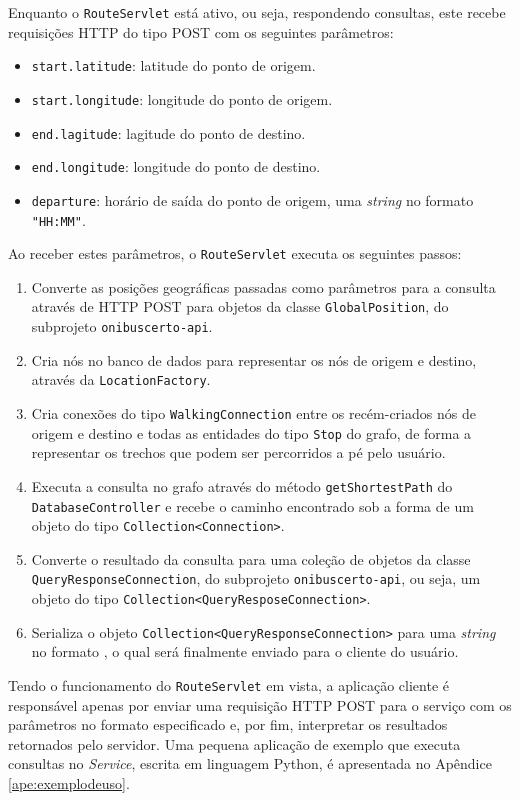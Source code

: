 Enquanto o \texttt{RouteServlet} está ativo, ou seja, respondendo consultas, este recebe requisições HTTP do tipo POST com os seguintes parâmetros:
\begin{itemize}
	\item \texttt{start.latitude}: latitude do ponto de origem.
	\item \texttt{start.longitude}: longitude do ponto de origem.
	\item \texttt{end.lagitude}: lagitude do ponto de destino.
	\item \texttt{end.longitude}: longitude do ponto de destino.
	\item \texttt{departure}: horário de saída do ponto de origem, uma \emph{string} no formato \texttt{"HH:MM"}.
\end{itemize}

Ao receber estes parâmetros, o \texttt{RouteServlet} executa os seguintes passos:
\begin{enumerate}
	\item Converte as posições geográficas passadas como parâmetros para a consulta através de HTTP POST para objetos da classe \texttt{GlobalPosition}, do subprojeto \texttt{onibuscerto-api}.
	\item Cria nós no banco de dados para representar os nós de origem e destino, através da \texttt{LocationFactory}.
	\item Cria conexões do tipo \texttt{WalkingConnection} entre os recém-criados nós de origem e destino e todas as entidades do tipo \texttt{Stop} do grafo, de forma a representar os trechos que podem ser percorridos a pé pelo usuário.
	\item Executa a consulta no grafo através do método \texttt{getShortestPath} do \texttt{DatabaseController} e recebe o caminho encontrado sob a forma de um objeto do tipo \texttt{Collection<Connection>}.
	\item Converte o resultado da consulta para uma coleção de objetos da classe \texttt{QueryResponseConnection}, do subprojeto \texttt{onibuscerto-api}, ou seja, um objeto do tipo \texttt{Collection<QueryResposeConnection>}.
	\item Serializa o objeto \texttt{Collection<QueryResponseConnection>} para uma \emph{string} no formato , o qual será finalmente enviado para o cliente do usuário.
\end{enumerate}

Tendo o funcionamento do \texttt{RouteServlet} em vista, a aplicação cliente é responsável apenas por enviar uma requisição HTTP POST para o serviço com os parâmetros no formato especificado e, por fim, interpretar os resultados retornados pelo servidor.
Uma pequena aplicação de exemplo que executa consultas no \emph{Service}, escrita em linguagem Python, é apresentada no Apêndice \ref{ape:exemplodeuso}.

